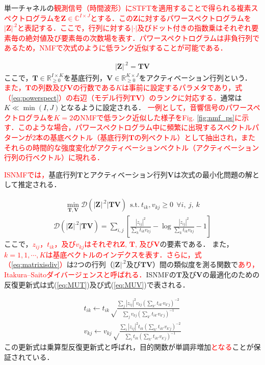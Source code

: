 単一チャネルの\textcolor{red}{観測信号（時間波形）にSTFTを適用することで得られる複素スペクトログラムを$\bm{Z}\in\mathbb{C}^{I\times J}$とする．この$\bm{Z}$に対するパワースペクトログラムを$|\bm{Z}|^{.2}$と表記する．ここで，行列に対する$|\cdot|$及びドット付きの指数乗はそれぞれ要素毎の絶対値及び要素毎の次数場を表す．パワースペクトログラムは非負行列であるため，NMFで次式のように低ランク近似することが可能である．}

\begin{align}
    |\bm{Z}|^{.2} = \bm{TV}　\label{eq:powerspect}
\end{align}
ここで，$\bm{T} \in \mathbb{R}^{I \times K}_{\geq 0}$を基底行列，$\bm{V} \in \mathbb{R}^{K \times J}_{\geq 0}$をアクティベーション行列という．
\textcolor{red}{また，$\bm{T}$の列数及び$\bm{V}$の行数である$K$は事前に設定するパラメタであり，式（\ref{eq:powerspect}）の右辺（モデル行列$\bm{TV}$）のランクに対応する．}通常は$K \ll \min (I,J)$となるように設定される．
\textcolor{red}{一例として，音響信号のパワースペクトログラムを$K=2$のNMFで低ランク近似した様子をFig. \ref{fig:nmf_ps}に示す．このような場合，パワースペクトログラム中に頻繁に出現するスペクトルパターンが2本の基底ベクトル（基底行列$\bm{T}$の列ベクトル）として抽出され，またそれらの時間的な強度変化がアクティベーションベクトル（アクティベーション行列の行ベクトル）に現れる．}

\textcolor{red}{ISNMFでは，}基底行列$\bm{T}$とアクティベーション行列$\bm{V}$は次式の最小化問題の解として推定される．

\begin{align}
    \nonumber \min_{\bm{T,V}} \mathcal{D}(|\bm{Z}|^{.2} | \bm{TV}) ~~\mathrm{s.t.} ~ t_{ik}, v_{kj} \geq 0 ~~\forall i,~j,~k
\end{align}
\begin{align}
    \mathcal{D}(|\bm{Z}|^{.2}|\bm{TV}) = \sum_{i,j}\left[ \frac{ |z_{ij}|^2 }{ \sum_{k}t_{ik}v_{kj} } - \log{\frac{ |z_{ij}|^2 }{ \sum_{k}t_{ik}v_{kj}}} -1 \right] \label{eq:matrixisdiv}
\end{align}
ここで，\textcolor{red}{$z_{ij}$，$t_{ik}$，及び$v_{kj}$はそれぞれ$\bm{Z}$, $\bm{T}$, 及び$\bm{V}$}の要素である．
また，\textcolor{red}{$k= 1, 1, \cdots, K$は基底ベクトルのインデクスを表す．さらに，式（\ref{eq:matrixisdiv}）}は2つの行列（$|\bm{Z}|^{.2}$及び$\bm{TV}$）間の類似度を測る関数で\textcolor{red}{あり，Itakura--Saitoダイバージェンスと呼ばれる．}ISNMFの$\bm{T}$及び$\bm{V}$の最適化のための反復更新式は式(\ref{eq:MUT})及び式(\ref{eq:MUV})で表される\cite{MU}．

\begin{align}
    t_{ik} \leftarrow t_{ik} \sqrt \frac{ \sum_j |z_{ij}|^2 v_{kj} \left( \sum_{k'} t_{ik'} v_{k'j} \right)^{-2} }{ \sum_j v_{kj} \left( \sum_{k'} t_{ik'} v_{k'j} \right)^{-1} } \label{eq:MUT} \\
    v_{kj} \leftarrow v_{kj} \sqrt \frac{ \sum_i |z_{ij}|^2 t_{ik} \left( \sum_{k'} t_{ik'} v_{k'j} \right)^{-2} }{ \sum_i t_{ik} \left( \sum_{k'} t_{ik'} v_{k'j} \right)^{-1} } \label{eq:MUV}
\end{align}
この更新式は乗算型反復更新式と呼ばれ，目的関数が単調非増加\textcolor{red}{となる}ことが保証されている．

